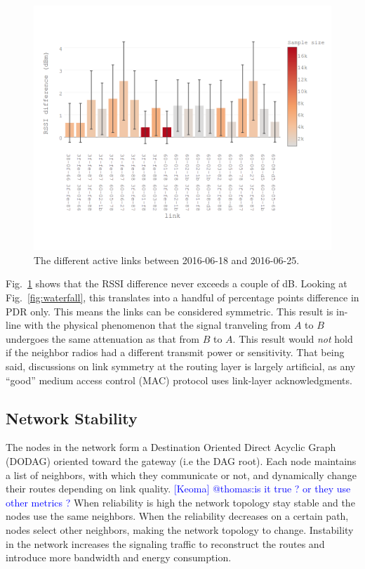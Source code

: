 \documentclass{sig-alternate}
\newcommand{\keoma}[1]       {\textcolor{blue}{[Keoma] #1}}
\begin{document}
\begin{figure}
    \centering
    \includegraphics[width=\columnwidth]{sym_plot}
    \caption{The different active links between 2016-06-18 and 2016-06-25.}
    \label{fig:tab_symmetry}
\end{figure}


Fig.~\ref{fig:tab_symmetry} shows that the RSSI difference never exceeds a couple of dB.
Looking at Fig.~\ref{fig:waterfall}, this translates into a handful of percentage points difference in PDR only.
This means the links can be considered symmetric.
This result is in-line with the physical phenomenon that the signal tranveling from $A$ to $B$ undergoes the same attenuation as that from $B$ to $A$.
This result would \textit{not} hold if the neighbor radios had a different transmit power or sensitivity.
That being said, discussions on link symmetry at the routing layer is largely artificial, as any ``good'' medium access control (MAC) protocol uses link-layer acknowledgments.

\subsection{Network Stability}
\label{sec:net_stability}


The nodes in the network form a Destination Oriented Direct Acyclic Graph (DODAG) oriented toward the gateway (i.e the DAG root).
Each node maintains a list of neighbors, with which they communicate or not, and dynamically change their routes depending on link quality. \keoma{@thomas:is it true ? or they use other metrics ?}
When reliability is high the network topology stay stable and the nodes use the same neighbors.
When the reliability decreases on a certain path, nodes select other neighbors, making the network topology to change.
Instability in the network increases the signaling traffic to reconstruct the routes and introduce more bandwidth and energy consumption.
\end{document}
